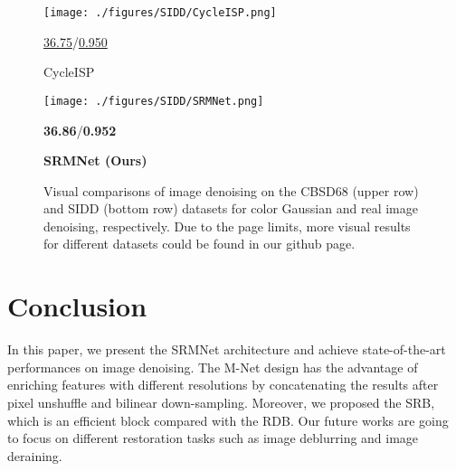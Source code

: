 \documentclass{article}
\begin{document}
\begin{figure*}[!t]
{\begin{minipage}{2.1cm}
	\texttt{[image: ./figures/SIDD/CycleISP.png]}
	\vspace*{-3mm}
	\caption*{\small{\underline{36.75}/\underline{0.950}}}
	\vspace*{-4mm}
	\caption*{\small{CycleISP \cite{12}}}
	\end{minipage}
	\begin{minipage}{2.1cm}
	\texttt{[image: ./figures/SIDD/SRMNet.png]}
	\vspace*{-3mm}
	\caption*{\small{\textbf{36.86}/\textbf{0.952}}}
	\vspace*{-4mm}
	\caption*{\footnotesize{\textbf{SRMNet (Ours)}}}
	\end{minipage}
	}\caption{Visual comparisons of image denoising on the CBSD68 \cite{35} (upper row) and SIDD \cite{40} (bottom row) datasets for color Gaussian and real image denoising, respectively. Due to the page limits, more visual results for different datasets could be found in our github page.}
\label{denoise_images}
\end{figure*}





\section{Conclusion}
In this paper, we present the SRMNet architecture and achieve state-of-the-art performances on image denoising. The M-Net design has the advantage of enriching features with different resolutions by concatenating the results after pixel unshuffle and bilinear down-sampling. Moreover, we proposed the SRB, which is an efficient block compared with the RDB. Our future works are going to focus on different restoration tasks such as image deblurring and image deraining. 



\fontsize{8.9pt}{8.9pt}
\selectfont

\end{document}
